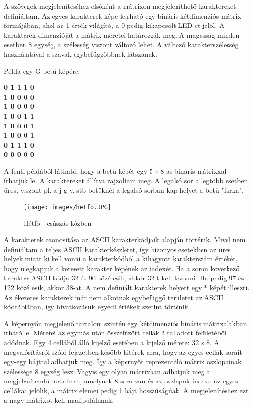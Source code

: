 \documentclass[a4paper, 12pt]{article}
\begin{document}
A szövegek megjelenítéséhez elsőként a mátrixon megjeleníthető karaktereket definiáltam. Az egyes karakterek képe leírható egy bináris kétdimenziós mátrix formájában, ahol az 1 érték világító, a 0 pedig kikapcsolt LED-et jelöl.
A karakterek dimenzióját a mátrix méretei határozzák meg. A magasság minden esetben 8 egység, a szélesség viszont változó lehet. A változó karakterszélesség használatával a szavak egybefüggőbbnek látszanak.

Példa egy G betű képére:
\begin{center}
\textbf{0 1 1 1 0\\
1 0 0 0 0\\
1 0 0 0 0\\
1 0 0 1 1\\
1 0 0 0 1\\
1 0 0 0 1\\
0 1 1 1 0\\
0 0 0 0 0}
\end{center}
A fenti példából látható, hogy a betű képét egy $5\times 8$-as bináris mátrixxal írhatjuk le. A karaktereket állítva rajzoltam meg. A legalsó sor a legtöbb esetben üres, viszont pl. a j-g-y, stb betűknél a legalsó sorban kap helyet a betű "farka".

\begin{figure}[ht]
	\centering
	\texttt{[image: images/hetfo.JPG]}
	\caption{Hétfő - csúszás közben}
	\label{fig:hetfo}
\end{figure}	

A karakterek azonosítása az ASCII karakterkódjaik alapján történik. Mivel nem definiáltam a teljes ASCII karakterkészletet, így bizonyos esetekben az üres helyek miatt ki kell vonni a karakterkódból a kihagyott karakterszám értékét, hogy megkapjuk a keresett karakter képének az indexét.
Ha a soron következő karakter ASCII kódja 32 és 90 közé esik, akkor 32-t kell levonni. Ha pedig 97 és 122 közé esik, akkor 38-at. A nem definiált karakterek helyett egy * képét illeszti.
Az ékezetes karakterek már nem alkotnak egybefüggő területet az ASCII kódtáblában, így hivatkozásuk egyedi értékek szerint történik.

A képernyőn megjelenő tartalom szintén egy kétdimenziós bináris mátrixalakban írható le. Méretei az egymás után összefűzött cellák által adott felületéből adódnak. Egy 4 cellából álló kijelző esetében a kijelző mérete: $32\times 8$.
A megvalósításról szóló fejezetben később kitérek arra, hogy az egyes cellák sorait egy-egy bájttal adhatjuk meg. Így a képernyőt reprezentáló mátrix oszlopainak szélessége 8 egység lesz. Vagyis egy olyan mátrixban adhatjuk meg a megjelenítendő tartalmat, amelynek 8 sora van és az oszlopok indexe az egyes cellákat jelölik, a mátrix elemei pedig 1 bájt hosszúságúak.
A megjelenítéshez ezt a nagy mátrixot kell manipulálnunk.
\end{document}
